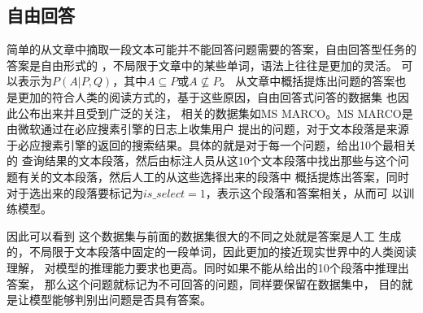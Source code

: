 


\subsection{自由回答}
简单的从文章中摘取一段文本可能并不能回答问题需要的答案，自由回答型任务的答案是自由形式的
，不局限于文章中的某些单词，语法上往往是更加的灵活。
可以表示为$P(A|P,Q)$，其中$A\subseteq P$或$A\nsubseteq P$。
从文章中概括提炼出问题的答案也是更加的符合人类的阅读方式的，基于这些原因，自由回答式问答的数据集
也因此公布出来并且受到广泛的关注，
相关的数据集如MS MARCO。MS MARCO是由微软通过在必应搜素引擎的日志上收集用户
提出的问题，对于文本段落是来源于必应搜素引擎的返回的搜索结果。具体的就是对于每一个问题，给出10个最相关的
查询结果的文本段落，然后由标注人员从这10个文本段落中找出那些与这个问题有关的文本段落，然后人工的从这些选择出来的段落中
概括提炼出答案，同时对于选出来的段落要标记为$is\_select=1$，表示这个段落和答案相关，从而可
以训练模型。

因此可以看到
这个数据集与前面的数据集很大的不同之处就是答案是人工
生成的，不局限于文本段落中固定的一段单词，因此更加的接近现实世界中的人类阅读理解，
对模型的推理能力要求也更高。同时如果不能从给出的10个段落中推理出答案，
那么这个问题就标记为不可回答的问题，同样要保留在数据集中，
目的就是让模型能够判别出问题是否具有答案。



\begin{table*}[!ht]
    \centering
\end{table*}

